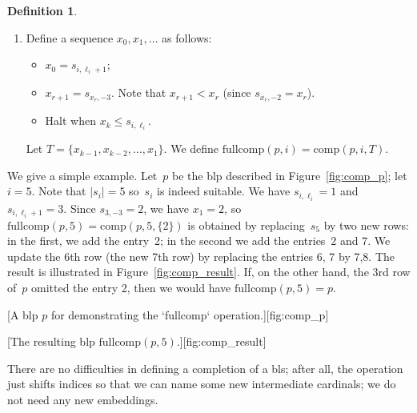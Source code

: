 \documentclass{article}
\theoremstyle{definition}
\newtheorem{definition}[lemma]{Definition}
\theoremstyle{remark}
\begin{document}
\begin{definition}
\begin{enumerate}
     \item Define a sequence $x_0,x_1,\dots$ as follows: 
     \begin{itemize}
       \item $x_0 = s_{i,\ell_i+1}$; 
       \item $x_{r+1}= s_{x_r,-3}$. Note that $x_{r+1}< x_r$ (since $s_{x_r,-2} = x_r$). 
       \item Halt when $x_k\le s_{i,\ell_i}$. 
     \end{itemize}

     Let $T = \{x_{k-1},x_{k-2},\dots, x_1\}$. We define $\mathrm{fullcomp}(p, i) = \mathrm{comp}(p, i, T)$. 
    \end{enumerate}
\end{definition}

We give a simple example. Let~$p$ be the blp described in Figure~\ref{fig:comp_p}; let $i=5$. Note that $|s_i|= 5$ so~$s_i$ is indeed suitable. We have $s_{i,\ell_i} = 1$ and $s_{i,\ell_i+1} = 3$. Since $s_{3,-3} = 2$, we have $x_1 = 2$, so $\mathrm{fullcomp}(p, 5) = \mathrm{comp}(p,5, \{2\})$ is obtained by replacing~$s_5$ by two new rows: in the first, we add the entry~2; in the second we add the entries~2 and $7$. We update the 6th row (the new 7th row) by replacing the entries 6, 7 by 7,8. The result is illustrated in Figure~\ref{fig:comp_result}. If, on the other hand, the 3rd row of~$p$ omitted the entry 2, then we would have $\mathrm{fullcomp}(p,5)= p$. 

[A blp $p$ for demonstrating the `fullcomp` operation.][fig:comp_p]

[The resulting blp $\mathrm{fullcomp}(p, 5)$.][fig:comp_result]


There are no difficulties in defining a completion of a bls; after all, the operation just shifts indices so that we can name some new intermediate cardinals; we do not need any new embeddings. 
\end{document}
